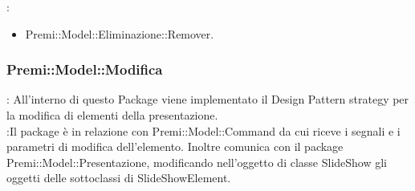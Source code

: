 {{{                \textbf{\base}: 
                    \begin{itemize}
                    \item Premi::Model::Eliminazione::Remover.
                    \end{itemize}
			}
	}
   \subsubsection{Premi::Model::Modifica}{
		\textbf{\tipo}: All’interno di questo Package viene implementato il Design Pattern strategy per la modifica di elementi della presentazione.\\
		\textbf{\relaz}:Il package è in relazione con Premi::Model::Command da cui riceve i segnali e i parametri di modifica dell’elemento. Inoltre comunica con il package Premi::Model::Presentazione, modificando nell’oggetto di classe SlideShow gli oggetti delle sottoclassi di SlideShowElement.\\
	
}}
